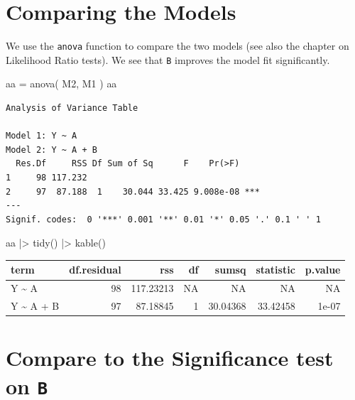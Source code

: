 \documentclass[
  letterpaper,
  DIV=11,
  numbers=noendperiod]{scrreprt}
\newenvironment{Shaded}{\begin{snugshade}}{\end{snugshade}}
\newcommand{\FunctionTok}[1]{\textcolor[rgb]{0.02,0.16,0.49}{#1}}
\newcommand{\NormalTok}[1]{\textcolor[rgb]{0.00,0.44,0.13}{#1}}
\newcommand{\OtherTok}[1]{\textcolor[rgb]{0.00,0.44,0.13}{#1}}
\newcommand{\SpecialCharTok}[1]{\textcolor[rgb]{0.25,0.44,0.63}{#1}}
\begin{document}
\hypertarget{comparing-the-models}{%
\section{Comparing the Models}\label{comparing-the-models}}

We use the \texttt{anova} function to compare the two models (see also
the chapter on Likelihood Ratio tests). We see that \texttt{B} improves
the model fit significantly.

\begin{Shaded}
\begin{Highlighting}[]
\NormalTok{aa }\OtherTok{=} \FunctionTok{anova}\NormalTok{( M2, M1 )}
\NormalTok{aa}
\end{Highlighting}
\end{Shaded}

\begin{verbatim}
Analysis of Variance Table

Model 1: Y ~ A
Model 2: Y ~ A + B
  Res.Df     RSS Df Sum of Sq      F    Pr(>F)    
1     98 117.232                                  
2     97  87.188  1    30.044 33.425 9.008e-08 ***
---
Signif. codes:  0 '***' 0.001 '**' 0.01 '*' 0.05 '.' 0.1 ' ' 1
\end{verbatim}

\begin{Shaded}
\begin{Highlighting}[]
\NormalTok{aa }\SpecialCharTok{|\textgreater{}} 
  \FunctionTok{tidy}\NormalTok{() }\SpecialCharTok{|\textgreater{}} 
  \FunctionTok{kable}\NormalTok{()}
\end{Highlighting}
\end{Shaded}

\begin{longtable}[]{@{}lrrrrrr@{}}
\toprule\noalign{}
term & df.residual & rss & df & sumsq & statistic & p.value \\
\midrule\noalign{}
\endhead
\bottomrule\noalign{}
\endlastfoot
Y \textasciitilde{} A & 98 & 117.23213 & NA & NA & NA & NA \\
Y \textasciitilde{} A + B & 97 & 87.18845 & 1 & 30.04368 & 33.42458 &
1e-07 \\
\end{longtable}

\hypertarget{compare-to-the-significance-test-on-b}{%
\section{\texorpdfstring{Compare to the Significance test on
\texttt{B}}{Compare to the Significance test on B}}\label{compare-to-the-significance-test-on-b}}
\end{document}
